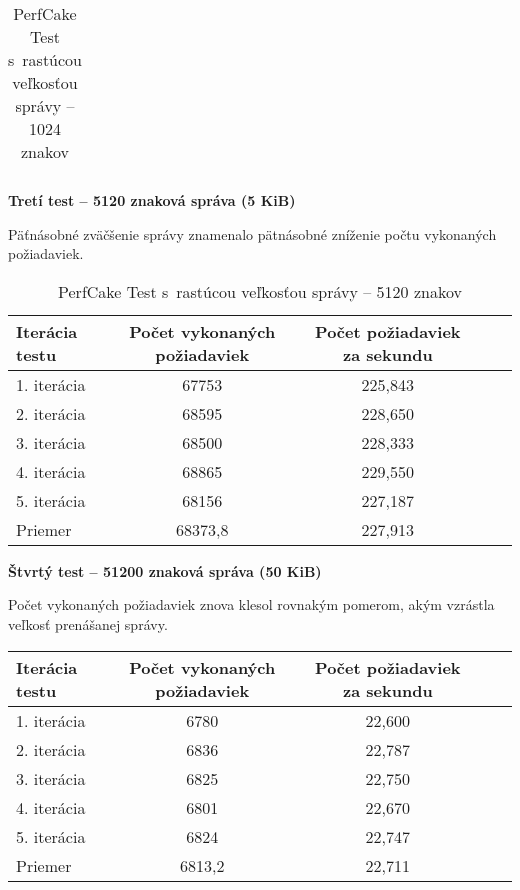 \documentclass[12pt,oneside,final]{fithesis-utf8}
\begin{document}
\begin{itemize}
\begin{table}[H]
\begin{center}
\begin{tabular}{ | l | c | c | c | c |}
\end{tabular}
\end{center}
\caption{PerfCake Test s~rastúcou veľkosťou správy -- 1024 znakov}
\end{table}


\textbf{Tretí test -- 5120 znaková správa (5 KiB)}

Päťnásobné zväčšenie správy znamenalo pätnásobné zníženie počtu vykonaných požiadaviek.

\begin{table}[H]
\begin{center}
\begin{tabular}{ | l | c | c | c | c |}
		\hline
		 \textbf{Iterácia testu} & \textbf{Počet vykonaných požiadaviek} & \textbf{Počet požiadaviek za sekundu} \\ \hline
		 1. iterácia & 67753 & 225,843 \\ \hline
		 2. iterácia & 68595 & 228,650 \\ \hline
		 3. iterácia & 68500 & 228,333 \\ \hline
		 4. iterácia & 68865 & 229,550 \\ \hline
		 5. iterácia & 68156 & 227,187 \\ \hline
		 Priemer & 68373,8 & 227,913 \\ \hline
		 
\end{tabular}
\end{center}
\caption{PerfCake Test s~rastúcou veľkosťou správy -- 5120 znakov}
\end{table}


\textbf{Štvrtý test -- 51200 znaková správa (50 KiB)}

Počet vykonaných požiadaviek znova klesol rovnakým pomerom, akým vzrástla veľkosť prenášanej správy.

\begin{table}[H]
\begin{center}
\begin{tabular}{ | l | c | c | c | c |}
		\hline
		 \textbf{Iterácia testu} & \textbf{Počet vykonaných požiadaviek} & \textbf{Počet požiadaviek za sekundu} \\ \hline
		 1. iterácia & 6780 & 22,600 \\ \hline
		 2. iterácia & 6836 & 22,787 \\ \hline
		 3. iterácia & 6825 & 22,750 \\ \hline
		 4. iterácia & 6801 & 22,670 \\ \hline
		 5. iterácia & 6824 & 22,747 \\ \hline
		 Priemer & 6813,2 & 22,711 \\ \hline
		 

\end{tabular}
\end{center}
\end{table}
\end{itemize}
\end{document}
